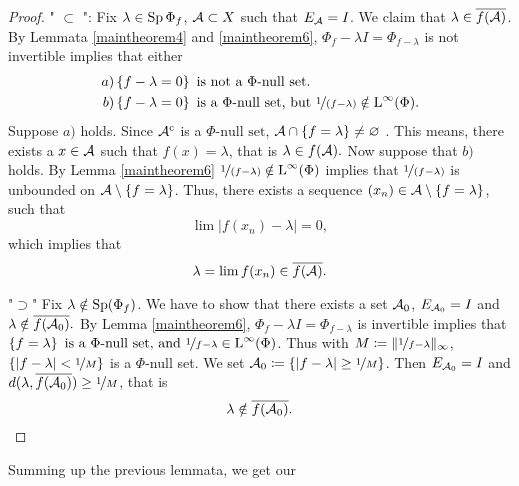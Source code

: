 \begin{proof}
 " $\subset$ ":
 Fix $\lambda \in \operatorname{Sp} \Phi_f$, $\mathcal{A} \subset X$ such that $E_\mathcal{A} = I$.
 We claim that $\lambda \in \overline{f(\mathcal{A})}$. By Lemmata \ref{maintheorem4}
 and \ref{maintheorem6}, $\Phi_f - \lambda I= \Phi_{f - \lambda}$ is 
 not invertible implies that either
\begin{align*}
  \left.  a\right)& \left\lbrace f- \lambda = 0 \right\rbrace \text{ is not a }\Phi
  \text{-null set}.\\
  \left.  b\right)& \left\lbrace f - \lambda =0 \right\rbrace \text{ is a }\Phi\text{-null set,
    but } \nicefrac{1}{(f- \lambda)} \notin {\text{L}^\infty }(\Phi).
\end{align*}
Suppose $a)$ holds. Since $\mathcal{A}^\mathrm{c}$ is a $\Phi\text{-null set}$,
$\mathcal{A} \cap \left\lbrace f= \lambda \right\rbrace \neq \varnothing$ .
This means, there exists a $x \in \mathcal{A}$ such that $f(x) = \lambda$, that is
$\lambda \in f(\mathcal{A}).$
Now suppose that $b)$ holds. By Lemma \ref{maintheorem6} $\nicefrac{1}{(f- \lambda)}
\notin {\text{L}^\infty }(\Phi)$ implies that $\nicefrac{1}{(f- \lambda)}$ is unbounded on
$\mathcal{A} \setminus \left\lbrace f= \lambda \right\rbrace$. Thus, there exists a sequence
$(x_n) \in \mathcal{A} \setminus \left\lbrace f= \lambda \right\rbrace$, such that
\[
 \lim | f(x_n) - \lambda| =0,
\]
which implies that
\[
\lambda = \lim f(x_n) \in \overline{f(\mathcal{A})}.
\]

"$\supset$"
Fix $\lambda \notin \operatorname{Sp} (\Phi_f)$. We have to show that there exists a set
$\mathcal{A}_0$, $E_{\mathcal{A}_0} = I$ and $\lambda \notin \overline{f(\mathcal{A}_0)}.$
By Lemma \ref{maintheorem6}, $\Phi_f - \lambda I= \Phi_{f- \lambda}$ is 
invertible implies that $ \left\lbrace f = \lambda \right\rbrace  \text{ is a }   \Phi
\text{-null set,} \text{ and } \nicefrac{1}{f - \lambda }  \in {\text{L}^\infty }(\Phi)$. Thus with 
$M \coloneqq \| \nicefrac{1}{f - \lambda} \|_\infty$,
$\left\lbrace | f- \lambda | < \nicefrac{1}{M} \right\rbrace$ is a $\Phi$-null set.
We set $\mathcal{A}_0 \coloneqq \left\lbrace | f- \lambda | \geq \nicefrac{1}{M} \right\rbrace $.
Then $E_{\mathcal{A}_0} = I$ and $d(\lambda, \overline{f(\mathcal{A}_0)}) \geq
\nicefrac{1}{M}$, that is 
\[
\lambda \notin \overline{f(\mathcal{A}_0)}.
\]

  
\end{proof}


Summing up the previous lemmata, we get our

